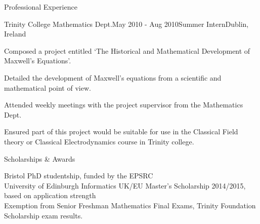 \documentclass{resume} %
\begin{document}
\begin{rSection}{Professional Experience}
  \begin{rSubsection}{Trinity College Mathematics Dept.}{May 2010 - Aug 2010}{Summer Intern}{Dublin, Ireland}
    \item Composed a project entitled `The Historical and Mathematical Development of Maxwell's Equations'.
    \item Detailed the development of Maxwell's equations from a scientific and mathematical point of view.
    \item Attended weekly meetings with the project supervisor from the Mathematics Dept.
    \item Ensured part of this project would be suitable for use in the Classical Field theory or Classical Electrodynamics course in Trinity college.
  \end{rSubsection}
\end{rSection}


\begin{rSection}{Scholarships \& Awards}

Bristol PhD studentship, funded by the EPSRC \\
University of Edinburgh Informatics UK/EU Master's Scholarship 2014/2015, based on application strength \\
Exemption from Senior Freshman Mathematics Final Exams, Trinity Foundation Scholarship exam results.

\end{rSection}

\newpage


%
%
\end{document}
